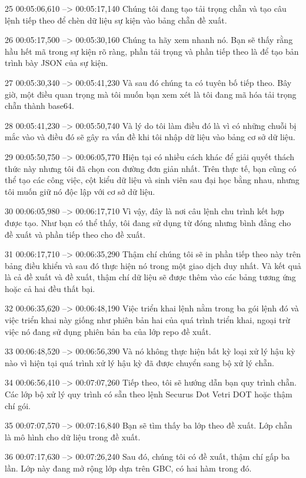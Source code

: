 25
00:05:06,610 --> 00:05:17,140
Chúng tôi đang tạo tải trọng chẵn và tạo câu lệnh tiếp theo để chèn dữ liệu sự kiện vào bảng chẵn đề xuất.

26
00:05:17,500 --> 00:05:30,160
Chúng ta hãy xem nhanh nó.  Bạn sẽ thấy rằng hầu hết mã trong sự kiện rõ ràng, phần tải trọng và phần tiếp theo là để tạo bản trình bày JSON của sự kiện.

27
00:05:30,340 --> 00:05:41,230
Và sau đó chúng ta có tuyên bố tiếp theo.  Bây giờ, một điều quan trọng mà tôi muốn bạn xem xét là tôi đang mã hóa tải trọng chẵn thành base64.

28
00:05:41,230 --> 00:05:50,740
Và lý do tôi làm điều đó là vì có những chuỗi bị mắc vào và điều đó sẽ gây ra vấn đề khi tôi nhập dữ liệu vào bảng cơ sở dữ liệu.

29
00:05:50,750 --> 00:06:05,770
Hiện tại có nhiều cách khác để giải quyết thách thức này nhưng tôi đã chọn con đường đơn giản nhất.  Trên thực tế, bạn cũng có thể tạo các công việc, cột kiểu dữ liệu và sinh viên sau đại học bằng nhau, nhưng tôi muốn giữ nó độc lập với cơ sở dữ liệu.

30
00:06:05,980 --> 00:06:17,710
Vì vậy, đây là nơi câu lệnh chu trình kết hợp được tạo.  Như bạn có thể thấy, tôi đang sử dụng từ đóng nhưng bình đẳng cho đề xuất và phần tiếp theo cho đề xuất.

31
00:06:17,710 --> 00:06:35,290
Thậm chí chúng tôi sẽ in phần tiếp theo này trên bảng điều khiển và sau đó thực hiện nó trong một giao dịch duy nhất.  Và kết quả là cả đề xuất và đề xuất, thậm chí dữ liệu sẽ được thêm vào các bảng tương ứng hoặc cả hai đều thất bại.

32
00:06:35,620 --> 00:06:48,190
Việc triển khai lệnh nằm trong ba gói lệnh đó và việc triển khai này giống như phiên bản hai của quá trình triển khai, ngoại trừ việc nó đang sử dụng phiên bản ba của lớp repo đề xuất.

33
00:06:48,520 --> 00:06:56,390
Và nó không thực hiện bất kỳ loại xử lý hậu kỳ nào vì hiện tại quá trình xử lý hậu kỳ đã được chuyển sang bộ xử lý chẵn.

34
00:06:56,410 --> 00:07:07,260
Tiếp theo, tôi sẽ hướng dẫn bạn quy trình chẵn.  Các lớp bộ xử lý quy trình có sẵn theo lệnh Securus Dot Vetri DOT hoặc thậm chí gói.

35
00:07:07,570 --> 00:07:16,840
Bạn sẽ tìm thấy ba lớp theo đề xuất.  Lớp chẵn là mô hình cho dữ liệu trong đề xuất.

36
00:07:17,630 --> 00:07:26,240
Sau đó, chúng tôi có đề xuất, thậm chí gấp ba lần.  Lớp này đang mở rộng lớp dựa trên GBC, có hai hàm trong đó.

